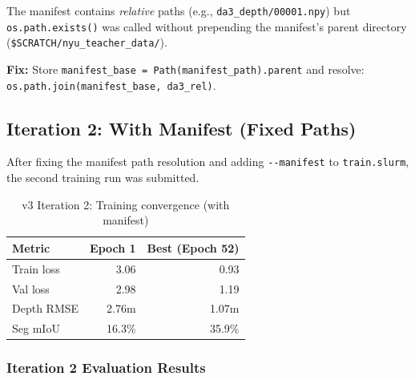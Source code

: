 \documentclass[11pt,a4paper]{article}
\begin{document}
The manifest contains \emph{relative} paths (e.g.,
\texttt{da3\_depth/00001.npy}) but \texttt{os.path.exists()} was called
without prepending the manifest's parent directory
(\texttt{\$SCRATCH/nyu\_teacher\_data/}).

\textbf{Fix:} Store \texttt{manifest\_base = Path(manifest\_path).parent}
and resolve: \texttt{os.path.join(manifest\_base, da3\_rel)}.

\subsection{Iteration 2: With Manifest (Fixed Paths)}

After fixing the manifest path resolution and adding \texttt{-{}-manifest}
to \texttt{train.slurm}, the second training run was submitted.

\begin{table}[h]
\centering
\caption{v3 Iteration 2: Training convergence (with manifest)}
\label{tab:v3-iter2-train}
\begin{tabular}{lrr}
\toprule
\textbf{Metric} & \textbf{Epoch 1} & \textbf{Best (Epoch 52)} \\
\midrule
Train loss     & 3.06  & 0.93  \\
Val loss       & 2.98  & 1.19  \\
Depth RMSE     & 2.76m & 1.07m \\
Seg mIoU       & 16.3\% & 35.9\% \\
\bottomrule
\end{tabular}
\end{table}

\subsubsection{Iteration 2 Evaluation Results}
\end{document}
